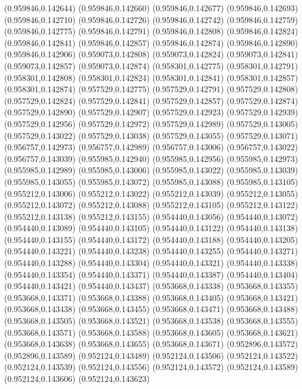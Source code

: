 (0.959846,0.142644)
(0.959846,0.142660)
(0.959846,0.142677)
(0.959846,0.142693)
(0.959846,0.142710)
(0.959846,0.142726)
(0.959846,0.142742)
(0.959846,0.142759)
(0.959846,0.142775)
(0.959846,0.142791)
(0.959846,0.142808)
(0.959846,0.142824)
(0.959846,0.142841)
(0.959846,0.142857)
(0.959846,0.142874)
(0.959846,0.142890)
(0.959846,0.142906)
(0.959073,0.142808)
(0.959073,0.142824)
(0.959073,0.142841)
(0.959073,0.142857)
(0.959073,0.142874)
(0.958301,0.142775)
(0.958301,0.142791)
(0.958301,0.142808)
(0.958301,0.142824)
(0.958301,0.142841)
(0.958301,0.142857)
(0.958301,0.142874)
(0.957529,0.142775)
(0.957529,0.142791)
(0.957529,0.142808)
(0.957529,0.142824)
(0.957529,0.142841)
(0.957529,0.142857)
(0.957529,0.142874)
(0.957529,0.142890)
(0.957529,0.142907)
(0.957529,0.142923)
(0.957529,0.142939)
(0.957529,0.142956)
(0.957529,0.142972)
(0.957529,0.142989)
(0.957529,0.143005)
(0.957529,0.143022)
(0.957529,0.143038)
(0.957529,0.143055)
(0.957529,0.143071)
(0.956757,0.142973)
(0.956757,0.142989)
(0.956757,0.143006)
(0.956757,0.143022)
(0.956757,0.143039)
(0.955985,0.142940)
(0.955985,0.142956)
(0.955985,0.142973)
(0.955985,0.142989)
(0.955985,0.143006)
(0.955985,0.143022)
(0.955985,0.143039)
(0.955985,0.143055)
(0.955985,0.143072)
(0.955985,0.143088)
(0.955985,0.143105)
(0.955212,0.143006)
(0.955212,0.143022)
(0.955212,0.143039)
(0.955212,0.143055)
(0.955212,0.143072)
(0.955212,0.143088)
(0.955212,0.143105)
(0.955212,0.143122)
(0.955212,0.143138)
(0.955212,0.143155)
(0.954440,0.143056)
(0.954440,0.143072)
(0.954440,0.143089)
(0.954440,0.143105)
(0.954440,0.143122)
(0.954440,0.143138)
(0.954440,0.143155)
(0.954440,0.143172)
(0.954440,0.143188)
(0.954440,0.143205)
(0.954440,0.143221)
(0.954440,0.143238)
(0.954440,0.143255)
(0.954440,0.143271)
(0.954440,0.143288)
(0.954440,0.143304)
(0.954440,0.143321)
(0.954440,0.143338)
(0.954440,0.143354)
(0.954440,0.143371)
(0.954440,0.143387)
(0.954440,0.143404)
(0.954440,0.143421)
(0.954440,0.143437)
(0.953668,0.143338)
(0.953668,0.143355)
(0.953668,0.143371)
(0.953668,0.143388)
(0.953668,0.143405)
(0.953668,0.143421)
(0.953668,0.143438)
(0.953668,0.143455)
(0.953668,0.143471)
(0.953668,0.143488)
(0.953668,0.143505)
(0.953668,0.143521)
(0.953668,0.143538)
(0.953668,0.143555)
(0.953668,0.143571)
(0.953668,0.143588)
(0.953668,0.143605)
(0.953668,0.143621)
(0.953668,0.143638)
(0.953668,0.143655)
(0.953668,0.143671)
(0.952896,0.143572)
(0.952896,0.143589)
(0.952124,0.143489)
(0.952124,0.143506)
(0.952124,0.143522)
(0.952124,0.143539)
(0.952124,0.143556)
(0.952124,0.143572)
(0.952124,0.143589)
(0.952124,0.143606)
(0.952124,0.143623)

